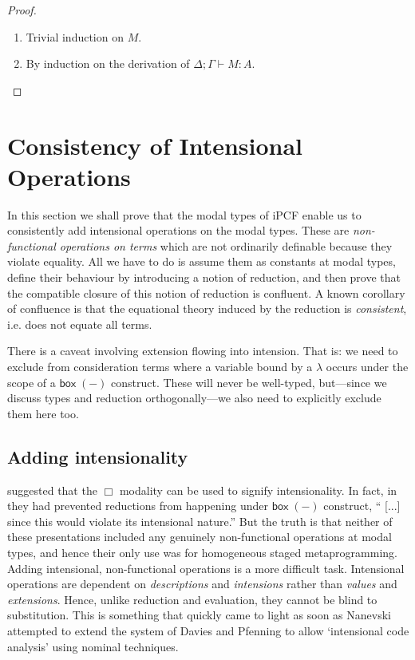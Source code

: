 \documentclass[11pt]{entcs}
\newcommand{\ctxt}[2]{#1\mathbin{;}#2}
\newcommand{\ibox}[1]{\mathsf{box\;}#1}
\begin{document}
\begin{proof} \hfill
  \begin{enumerate}
    \item
      Trivial induction on $M$.
    \item
      By induction on the derivation of $\ctxt{\Delta}{\Gamma}
      \vdash M : A$.
  \end{enumerate}
\end{proof}


\section{Consistency of Intensional Operations}
  \label{sec:ipcfconfl}

In this section we shall prove that the modal types of iPCF enable
us to consistently add intensional operations on the modal types.
These are \emph{non-functional operations on terms} which are not
ordinarily definable because they violate equality.  All we have
to do is assume them as constants at modal types, define their
behaviour by introducing a notion of reduction, and then
prove that the compatible closure of this notion of reduction is
confluent. A known corollary of confluence is that the equational
theory induced by the reduction is \emph{consistent}, i.e. does
not equate all terms.

There is a caveat involving extension flowing into intension. That
is: we need to exclude from consideration terms where a variable
bound by a $\lambda$ occurs under the scope of a $\ibox{(-)}$
construct. These will never be well-typed, but---since we discuss
types and reduction orthogonally---we also need to explicitly
exclude them here too.

\subsection{Adding intensionality}

 \cite{Davies2001} suggested that
the $\Box$ modality can be used to signify intensionality. In
fact, in \cite{Davies2001,Davies2001a} they had prevented
reductions from happening under $\ibox{(-)}$ construct, `` [...]
since this would violate its intensional nature.'' But the truth
is that neither of these presentations included any genuinely
non-functional operations at modal types, and hence their only use
was for homogeneous staged metaprogramming. Adding intensional,
non-functional operations is a more difficult task. Intensional
operations are dependent on \emph{descriptions} and
\emph{intensions} rather than \emph{values} and \emph{extensions}.
Hence, unlike reduction and evaluation, they cannot be blind to
substitution. This is something that quickly came to light as soon
as Nanevski \cite{Nanevski2002} attempted to extend the system of
Davies and Pfenning to allow `intensional code analysis' using
nominal techniques.
\end{document}
